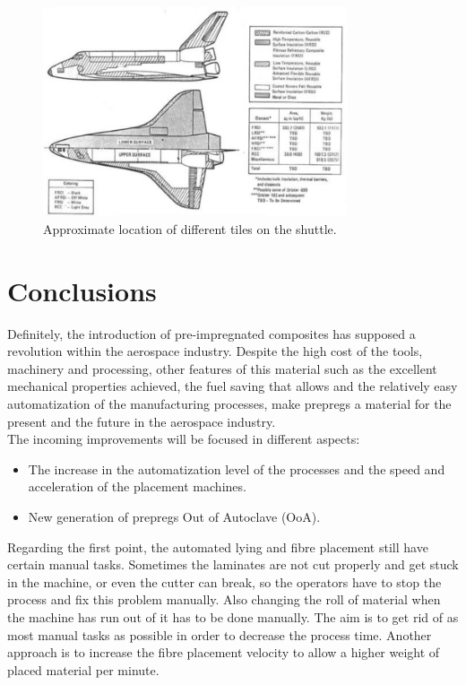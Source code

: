 \begin{figure}[h]
	\centering
	\includegraphics[width=0.8\textwidth]{img/space_shuttle.png}
	\caption[Use of composites in the Space Shuttle]{Approximate location of different tiles on the shuttle.\cite{Oakes}}
	\label{fig:space_shuttle}
\end{figure}

\section{Conclusions}

Definitely, the introduction of pre-impregnated composites has supposed a
revolution within the aerospace industry. Despite the high cost of the tools,
machinery and processing, other features of this material such as the excellent
mechanical properties achieved, the fuel saving that allows and the relatively
easy automatization of the manufacturing processes, make prepregs a material for
the present and the future in the aerospace industry.\\

The incoming improvements will be focused in different aspects:\\

\begin{itemize}
	\item The increase in the automatization level of the processes and the
	speed and acceleration of the placement machines.
	\item New generation of prepregs Out of Autoclave (OoA).
\end{itemize}

Regarding the first point, the automated lying and fibre placement still have
certain manual tasks. Sometimes the laminates are not cut properly and get stuck in
the machine, or even the cutter can break, so the operators have to stop the process
and fix this problem manually. Also changing the roll of material when the machine
has run out of it has to be done manually. The aim is to get rid of as most manual
tasks as possible in order to decrease the process time. Another approach is to
increase the fibre placement velocity to allow a higher weight of placed material
per minute.\\

